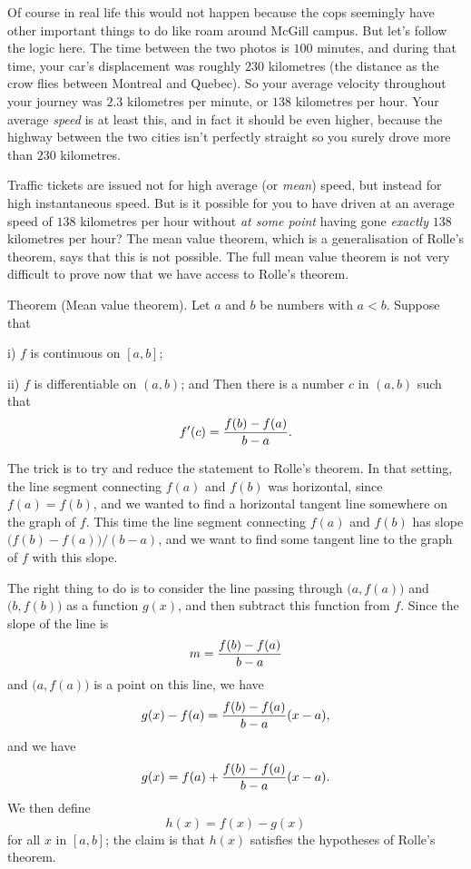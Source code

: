 Of course in real life this would not happen because the cops seemingly have other important
things to do like roam around McGill campus. But let's follow the logic here. The time between the
two photos is $100$ minutes, and during that time, your car's displacement was roughly $230$ kilometres (the
distance as the crow flies between Montreal and Quebec). So your average velocity throughout your journey
was $2.3$ kilometres per minute, or $138$ kilometres per hour.
Your average {\it speed} is at least this, and in fact it should be even higher,
because the highway between the two cities isn't perfectly straight so you surely drove more than $230$
kilometres.

Traffic tickets are issued not for high average (or {\it mean})
speed, but instead for high instantaneous speed. But is it possible for you
to have driven at an average speed of $138$ kilometres per hour without {\it at some point} having
gone {\it exactly} $138$ kilometres per hour? The mean value theorem, which is a generalisation of Rolle's
theorem, says that this is not possible.
The full mean value theorem is not very difficult to prove now that we have access to Rolle's theorem.

\parenproclaim Theorem {\advthm} (Mean value theorem).
Let $a$ and $b$ be numbers with $a<b$. Suppose that
\medskip
\item{i)} $f$ is continuous on $[a,b]$;
\smallskip
\item{ii)} $f$ is differentiable on $(a,b)$; and
\medskip\noindent
Then there is a number $c$ in $(a,b)$ such that
$$f'(c) = {f(b) - f(a)\over b-a}.$$

\proof The trick is to try and reduce the statement to Rolle's theorem. In that setting,
the line segment connecting $f(a)$ and $f(b)$ was horizontal, since $f(a) = f(b)$, and we wanted
to find a horizontal tangent line somewhere on the graph of $f$. This time the line segment
connecting $f(a)$ and $f(b)$ has slope $\bigl( f(b) - f(a)\bigr) / (b-a)$, and we want to find
some tangent line to the graph of $f$ with this slope.

The right thing to do is to consider the line passing through $\bigl(a, f(a)\bigr)$ and $\bigl( b, f(b)\bigr)$
as a function $g(x)$, and then subtract this function from $f$. Since the slope of the line is
$$ m = {f(b) - f(a)\over b-a}$$
and $\bigl( a, f(a)\bigr)$ is a point on this line, we have
$$g(x) - f(a) = {f(b) - f(a)\over b-a} (x-a),$$
and we have
$$g(x) = f(a) + {f(b) - f(a)\over b-a} (x-a).$$
We then define
$$h(x) = f(x) - g(x)$$
for all $x$ in $[a,b]$;
the claim is that $h(x)$ satisfies the hypotheses of Rolle's theorem.

